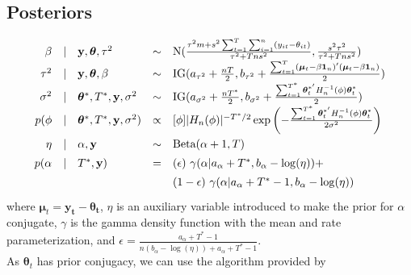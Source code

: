 \documentclass[11pt]{article}
\def\ds{\displaystyle}
\newcommand{\m}[1]{\mathbf{\bm{#1}}} %
\def\ds{\displaystyle}
\begin{document}
\subsection{Posteriors}
\[\def\arraystretch{1.4}
  \begin{array}{rclcl}
    \beta &|& \m y, \m\theta, \tau^2  &\sim& \text{N}(
      \frac{\tau^2m + s^2\sum_{t=1}^T\sum_{i=1}^n(y_{it}-\theta_{it})}{\tau^2+Tns^2},
      \frac{s^2\tau^2}{\tau^2+Tns^2}) \\
    \tau^2 &|& \m y, \m\theta, \beta  &\sim& \text{IG}(a_{\tau^2}+\frac{nT}{2},
    b_{\tau^2}+\frac{\sum_{t=1}^T (\m\mu_t-\beta \m1_n)'(\m\mu_t-\beta \m1_n)}{2})\\
    \sigma^2 &|& \m\theta^*, T^*, \m y, \sigma^2 &\sim& \text{IG}(a_{\sigma^2}+\frac{nT^*}{2},
    b_{\sigma^2}+\frac{\sum_{t=1}^{T^*}\m\theta_t^{*'} H_n^{-1}(\phi)\m\theta_t^*}{2})\\
    p(\phi &|& \m\theta^*, T^*, \m y, \sigma^2) &\propto& 
    [\phi]|H_n(\phi)|^{-T^*/2} \exp\left(-\frac{\sum_{t=1}^{T^*}\m\theta_t^{*'} H_n^{-1}(\phi)\m\theta_t^*}{2\sigma^2}\right)\\
    \eta &|& \alpha, \m y &\sim& \text{Beta}(\alpha+1,T)\\
    p(\alpha &|& T^*, \m y) &=& (\epsilon)~\gamma(\alpha | a_\alpha+T^*, b_\alpha-\log(\eta)) +\\
             &&&&(1-\epsilon)~\gamma(\alpha | a_\alpha+T^*-1, b_\alpha-\log(\eta))\\
  \end{array}
\]
where $\m\mu_t=\m{y_t -\theta_t} $, $\eta$ is an auxiliary variable introduced
to make the prior for $\alpha$ conjugate, $\gamma$ is the gamma density
function with the mean and rate parameterization, and 
$\epsilon = \ds\frac{a_\alpha +T^* - 1}{ n(b_\alpha-\log(\eta)) + a_\alpha +T^* -1}$.\\

\noindent
As $\m\theta_t$ has prior conjugacy, we can use the algorithm provided by \cite{escobar}
\end{document}
